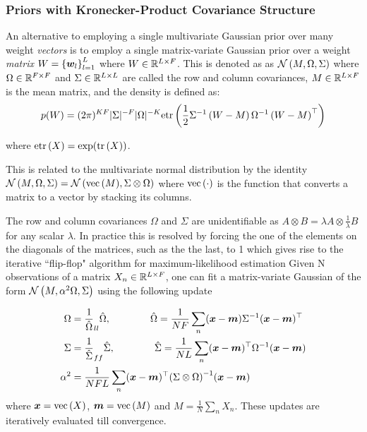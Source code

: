 

\subsubsection{Priors with Kronecker-Product Covariance Structure}
An alternative to employing a single multivariate Gaussian prior over many weight \emph{vectors} is to employ a single matrix-variate Gaussian\cite{Gupta1999} prior over a weight \emph{matrix} $W = \left\{\bm w_l\right\}_{l=1}^L$ where $W \in { \mathbb{R}^{L \times F} }$. This is denoted as as $\mathcal{N} \left(M, \Omega, \Sigma\right)$ where $\Omega \in { \mathbb{R}^{F \times F} }$ and $\Sigma \in { \mathbb{R}^{L \times L} }$ are called the row and column covariances, $M \in { \mathbb{R}^{L \times F} }$ is the mean matrix, and the density is defined as:
\begin{equation}
p(W) = (2\pi)^{KF}|\Sigma|^{-F}|\Omega|^{-K} \text{etr}\left( { \frac{1}{2} {\Sigma}^{-1}\left(W - M\right) {\Omega}^{-1} \left(W - M \right)^\top } \right)
\end{equation}

where $\text{etr}\left( { X } \right) = \exp (\text{tr} \left( {X} \right))$.

This is related to the multivariate normal distribution by the identity $\mathcal{N} \left(M, \Omega, \Sigma\right) = \mathcal{N} \left( {\text{vec}\left(M\right)}, {\Sigma \otimes \Omega} \right)$ where $\text{vec}\left(\cdot\right)$ is the function that converts a matrix to a vector by stacking its columns. 

The row and column covariances $\Omega$ and $\Sigma$ are unidentifiable as $A \otimes B = \lambda A \otimes \frac{1}{\lambda}B$ for any scalar $\lambda$. In practice this is resolved by forcing the one of the elements on the diagonals of the matrices, such as the the last, to 1 which gives rise to the iterative ``flip-flop" algorithm\cite{Srivastava2009} for maximum-likelihood estimation Given N observations of a matrix $X_n \in { \mathbb{R}^{L \times F} }$, one can fit a matrix-variate Gaussian of the form $\mathcal{N} \left(M, \alpha^2 \Omega, \Sigma\right)$ using the following update

\begin{align}
\Omega & = \frac{1}{\hat{\Omega}}_{ll} \hat{\Omega}, \qquad\qquad\hat{\Omega} = \frac{1}{N F} \sum_n (\bm x - \bm m) {\Sigma}^{-1} (\bm x - \bm m)^\top \\
\Sigma & = \frac{1}{\hat{\Sigma}}_{ff} \hat{\Sigma}, \qquad\qquad\hat{\Sigma} = \frac{1}{N L} \sum_n (\bm x - \bm m)^\top {\Omega}^{-1} (\bm x - \bm m) \\
\alpha^2 & = \frac{1}{NFL} \sum_n (\bm x - \bm m)^\top{\left( \Sigma \otimes \Omega \right)}^{-1}(\bm x - \bm m)
\end{align}
where $\bm x = \text{vec}\left(X\right)$, $\bm m = \text{vec}\left(M\right)$ and $M=\frac{1}{N} \sum_n X_n$. These updates are iteratively evaluated till convergence.

